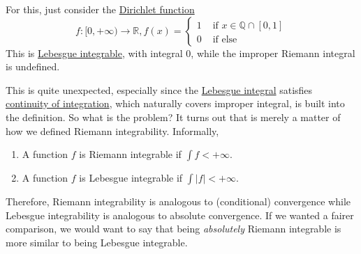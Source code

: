   \begin{example}
    \label{ex:lebesgue-integrable-but-not-improperly-riemann}
    For this, just consider the \hyperref[real-ex:dirichlet-function]{Dirichlet function} 
    \begin{equation}
      f: [0, +\infty) \to \mathbb{R}, f(x) = \begin{cases} 
        1 & \text{ if } x \in \mathbb{Q} \cap [0, 1] \\ 
        0 & \text{ if else }
      \end{cases}
    \end{equation}
    This is \hyperref[def:leb-int-signed]{Lebesgue integrable}, with integral $0$, while the improper Riemann integral is undefined. 
  \end{example}

  This is quite unexpected, especially since the \hyperref[def:leb-int-signed]{Lebesgue integral} satisfies \hyperref[thm:continuity-integration]{continuity of integration}, which naturally covers improper integral, is built into the definition. So what is the problem? It turns out that is merely a matter of how we defined Riemann integrability. Informally, 
  \begin{enumerate}
    \item A function $f$ is Riemann integrable if $\int f < +\infty$. 
    \item A function $f$ is Lebesgue integrable if $\int |f| < +\infty$. 
  \end{enumerate}
  Therefore, Riemann integrability is analogous to (conditional) convergence while Lebesgue integrability is analogous to absolute convergence. If we wanted a fairer comparison, we would want to say that being \textit{absolutely} Riemann integrable is more similar to being Lebesgue integrable. 

